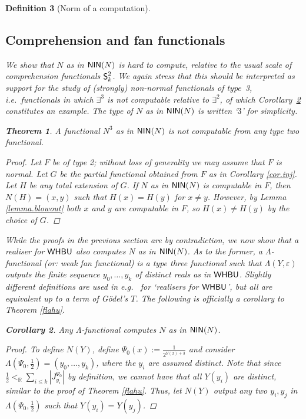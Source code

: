 \documentclass[reqno]{amsart}
\newtheorem{thm}{Theorem}
\newtheorem{cor}[thm]{Corollary}
\newtheorem{defi}[thm]{Definition}
\def\R{{\mathbb  R}}
\def\NIN{\textup{\textsf{NIN}}}
\def\SS{\textup{\textsf{S}}}
\def\WHBU{\textup{\textsf{WHBU}}}
\def\eps{\varepsilon}
\numberwithin{equation}{section}
\numberwithin{thm}{section}
\begin{document}
\begin{defi}[Norm of a computation]
\subsection{Comprehension and fan functionals}
We show that $N$ as in $\NIN(N)$ is \emph{hard to compute}, relative to the usual scale of comprehension functionals $\SS_{k}^{2}$.
We again stress that this should be interpreted as support for the study of (strongly) non-normal functionals of type~3, 
i.e.\ functionals in which $\exists^{3}$ is not computable relative to $\exists^{2}$, of which Corollary~\ref{corkei} constitutes an example.
The type of $N$ as in $\NIN(N)$ is written `$3$' for simplicity. 
\begin{thm}\label{ninot}
A functional $N^{3}$ as in $\NIN(N)$ is not computable from any type two functional.
\end{thm}
\begin{proof}Let $F$ be of type 2; without loss of generality we may assume that $F$ is normal.  Let $G$ be the partial functional obtained from $F$ as in Corollary  \ref{cor.inj}. Let $H$ be any total extension of $G$. If $N$ as in $\NIN(N)$ is computable in $F$, then $N(H) = (x,y)$ such that $H(x) = H(y)$ for $x\ne y$. However, by Lemma \ref{lemma.blowout} both $x$ and $y$ are computable in $F$, so $H(x)\ne H(y)$ by the choice of $G$.
\end{proof}
While the proofs in the previous section are by contradiction, we now show that a realiser for $\WHBU$ also computes $N$ as in $\NIN(N)$.
As to the former, a \emph{$\Lambda$-functional} (or: \emph{weak fan functional}) is a type three functional such that $\Lambda(Y, \eps)$ outputs the finite sequence $y_{0}, \dots, y_{k}$ of distinct reals as in $\WHBU$.  
Slightly different definitions are used in e.g.\ \cites{dagsam, dagsamII} for `realisers for $\WHBU$', but all are equivalent up to a term of G\"odel's $T$.  The following is officially a corollary to Theorem \ref{flahu}. 
\begin{cor}\label{corkei}
Any $\Lambda$-functional computes $N$ as in $\NIN(N)$.  
\end{cor}
\begin{proof}
To define $N(Y)$, define $\Psi_{0}(x):=\frac{1}{2^{Y(x)+3}}$ and consider $\Lambda(\Psi_{0}, \frac{1}{2})=(y_{0}, \dots, y_{k})$, where the $y_{i}$ are assumed distinct. 
Note that since $\frac{1}{2}<_{\R}\sum_{i\leq k}| J_{y_{i}}^{\Psi_{0}}|$ by definition, we cannot have that all $Y(y_{i})$ are distinct, similar to the proof of Theorem \ref{flahu}.  
Thus, let $N(Y)$ output any two $y_{i}, y_{j}$ in $\Lambda(\Psi_{0}, \frac{1}{2})$ such that $Y(y_{i})=Y(y_{j})$.

\end{proof}
\end{defi}
\end{document}
